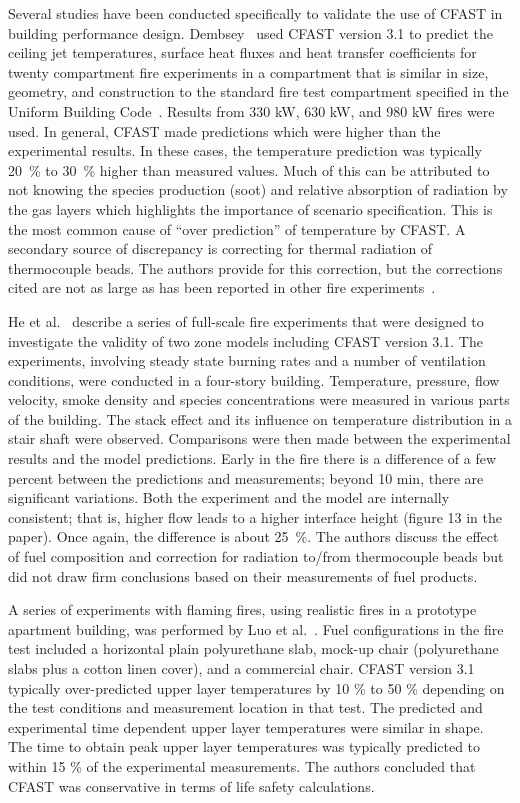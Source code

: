 Several studies have been conducted specifically to validate the use of CFAST in building performance design. Dembsey~\cite{Valid:Dempsey} used CFAST version 3.1 to predict the ceiling jet temperatures, surface heat fluxes and heat transfer coefficients for twenty compartment fire experiments in a compartment that is similar in size, geometry, and construction to the standard fire test compartment specified in the Uniform Building Code~\cite{UBC}. Results from 330 kW, 630 kW, and 980 kW fires were used. In general, CFAST made predictions which were higher than the experimental results. In these cases, the temperature prediction was typically 20~\% to 30~\% higher than measured values. Much of this can be attributed to not knowing the species production (soot) and relative absorption of radiation by the gas layers which highlights the importance of scenario specification. This is the most common cause of  ``over prediction'' of temperature by CFAST. A secondary source of discrepancy is correcting for thermal radiation of thermocouple beads. The authors provide for this correction, but the corrections cited are not as large as has been reported in other fire experiments~\cite{Valid:Pitts}.

He et al.~\cite{Valid:He} describe a series of full-scale fire experiments that were designed to investigate the validity of two zone models including CFAST version 3.1. The experiments, involving steady state burning rates and a number of ventilation conditions, were conducted in a four-story building. Temperature, pressure, flow velocity, smoke density and species concentrations were measured in various parts of the building. The stack effect and its influence on temperature distribution in a stair shaft were observed. Comparisons were then made between the experimental results and the model predictions. Early in the fire there is a difference of a few percent between the predictions and measurements; beyond 10 min, there are significant variations. Both the experiment and the model are internally consistent; that is, higher flow leads to a higher interface height (figure 13 in the paper). Once again, the difference is about 25~\%. The authors discuss the effect of fuel composition and correction for radiation to/from thermocouple beads but did not draw firm conclusions based on their measurements of fuel products.

A series of experiments with flaming fires, using realistic fires in a prototype apartment building, was performed by Luo et al.~\cite{Valid:Luo}. Fuel configurations in the fire test included a horizontal plain polyurethane slab, mock-up chair (polyurethane slabs plus a cotton linen cover), and a commercial chair. CFAST version 3.1 typically over-predicted upper layer temperatures by 10 \% to 50 \% depending on the test conditions and measurement location in that test. The predicted and experimental time dependent upper layer temperatures were similar in shape. The time to obtain peak upper layer temperatures was typically predicted to within 15 \% of the experimental measurements. The authors concluded that CFAST was conservative in terms of life safety calculations.

